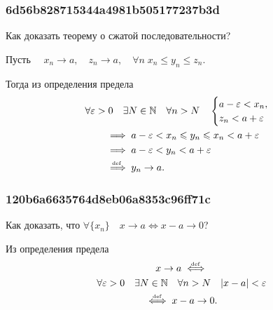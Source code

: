 \documentclass[11pt, a5paper]{article}
\newenvironment{note}[1]{\goodbreak\par\subsubsection{\hfill \color{lightgray}\tiny #1}}{}
\newenvironment{cloze}[2][\ldots]{\begin{leftbar}}{\end{leftbar}}
\begin{document}
    \begin{note}{6d56b828715344a4981b505177237b3d}
        Как доказать теорему о сжатой последовательности?

        \begin{cloze}{1}
            Пусть \( \quad x_n \to a, \quad z_n \to a, \quad
            \forall n\; x_n \leqslant y_n \leqslant z_n. \)

            Тогда из определения предела \[
                \begin{gathered}
                    \forall \varepsilon > 0 \quad \exists N \in \mathbb N \quad
                    \forall n > N \quad \begin{cases}
                        a - \varepsilon < x_n, \\
                        z_n < a + \varepsilon
                    \end{cases} \\
                    \begin{aligned}
                        &\implies a - \varepsilon < x_n \leqslant y_n \leqslant
                        x_n < a + \varepsilon \\
                        &\implies a - \varepsilon < y_n < a + \varepsilon \\
                        &\overset{\!\!\text{\tiny def}}\implies y_n \to a.
                    \end{aligned}
                \end{gathered}
            \]
        \end{cloze}
    \end{note}

    \begin{note}{120b6a6635764d8eb06a8353c96ff71c}
        Как доказать, что \( \forall \{ x_n \} \quad x \to a \iff x - a \to 0 \)?

        \begin{cloze}{1}
            Из определения предела \begin{multline*}
                x \to a \overset{\hspace{-1pt}\text{\tiny def}}\iff  \\
                \forall \varepsilon > 0 \quad \exists N \in \mathbb N \quad
                \forall n > N \quad |x - a| < \varepsilon \\
                \overset{\hspace{-1pt}\text{\tiny def}}\iff x - a \to 0.
            \end{multline*}
        \end{cloze}
    \end{note}
\end{document}
